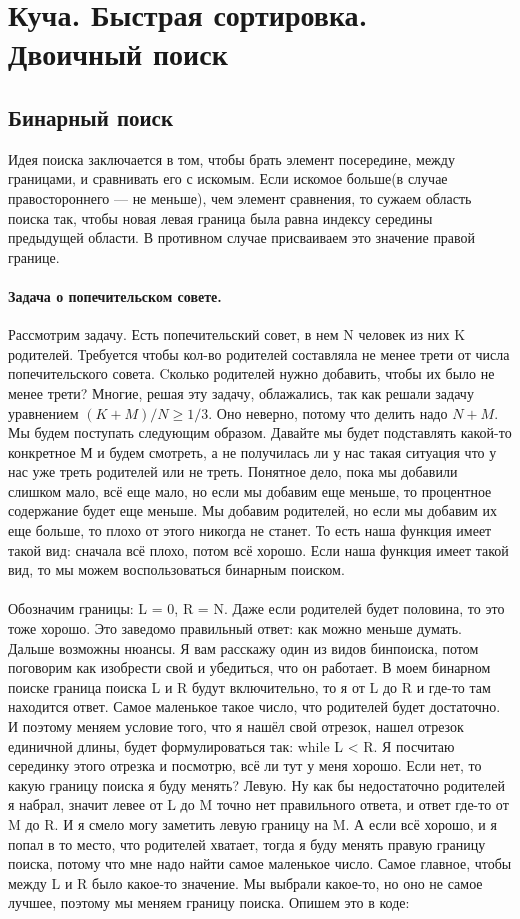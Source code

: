 \documentclass[a4paper,12pt]{article}
\begin{document}
\section{Куча. Быстрая сортировка. Двоичный поиск}
\subsection{Бинарный поиск}
Идея поиска заключается в том, чтобы брать элемент посередине, между границами, и сравнивать его с искомым. Если искомое больше(в случае правостороннего — не меньше), чем элемент сравнения, то сужаем область поиска так, чтобы новая левая граница была равна индексу середины предыдущей области. В противном случае присваиваем это значение правой границе.
\paragraph{Задача о попечительском совете.}
Рассмотрим задачу. Есть попечительский совет, в нем N человек из них K родителей. Требуется чтобы кол-во родителей составляла не менее трети от числа попечительского совета. Cколько родителей нужно добавить, чтобы их было не менее трети? Многие, решая эту задачу, облажались, так как решали задачу уравнением $(K + M)/N \geq 1/3$. Оно неверно, потому что делить надо $N+M$. Мы будем поступать следующим образом. Давайте мы будет подставлять какой-то конкретное М и будем смотреть, а не получилась ли у нас такая ситуация что у нас уже треть родителей или не треть. Понятное дело, пока мы добавили слишком мало, всё еще мало, но если мы добавим еще меньше, то процентное содержание будет еще меньше. Мы добавим родителей, но если мы добавим их еще больше, то плохо от этого никогда не станет. То есть наша функция имеет такой вид: сначала всё плохо, потом всё хорошо. Если наша функция имеет такой вид, то мы можем воспользоваться бинарным поиском.\\ \\ Обозначим границы: L = 0, R = N. Даже если родителей будет половина, то это тоже хорошо. Это заведомо правильный ответ: как можно меньше думать. Дальше возможны нюансы. Я вам расскажу один из видов бинпоиска, потом поговорим как изобрести свой и убедиться, что он работает. В моем бинарном поиске граница поиска L и R будут включительно, то я от L до R и где-то там находится ответ. Самое маленькое такое число, что родителей будет достаточно. И поэтому меняем условие того, что я нашёл свой отрезок, нашел отрезок единичной длины, будет формулироваться так: while L < R. Я посчитаю серединку этого отрезка и посмотрю, всё ли тут у меня хорошо. Если нет, то какую границу поиска я буду менять? Левую. Ну как бы недостаточно родителей я набрал, значит левее от L до M точно нет правильного ответа, и ответ где-то от M до R. И я смело могу заметить левую границу на M. А если всё хорошо, и я попал в то место, что родителей хватает, тогда я буду менять правую границу поиска, потому что мне надо найти самое маленькое число. Самое главное, чтобы между L и R было какое-то значение. Мы выбрали какое-то, но оно не самое лучшее, поэтому мы меняем границу поиска. Опишем это в коде:
\end{document}
